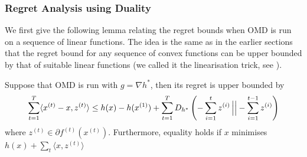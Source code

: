 \subsubsection{Regret Analysis using Duality}
We first give the following lemma relating the regret bounds when OMD is run on a sequence of linear functions. The idea is the same as in the earlier sections that the regret bound for any sequence of convex functions can be upper bounded by that of suitable linear functions (we called it the linearisation trick, see ).
\begin{theorem}\label{lemma:duality_preliminary}
    Suppose that OMD is run with $g = \nabla h^*$, then its regret is upper bounded by \begin{equation}
        \sum_{t=1}^T\langle x^{(t)} - x, z^{(t)} \rangle \leq h(x) - h(x^{(1)}) + \sum_{t=1}^T D_{h^*}\left(-\sum_{i=1}^t z^{(i)} \left\vert \vphantom{\frac{a}{b}} \right\vert  -\sum_{i=1}^{t-1}z^{(i)}\right)   \end{equation}
        where $z^{(t)} \in \partial f^{(t)}(x^{(t)})$. Furthermore, equality holds if $x$ minimises $h(x) + \sum_{t} \langle x, z^{(t)} \rangle$
\end{theorem}
